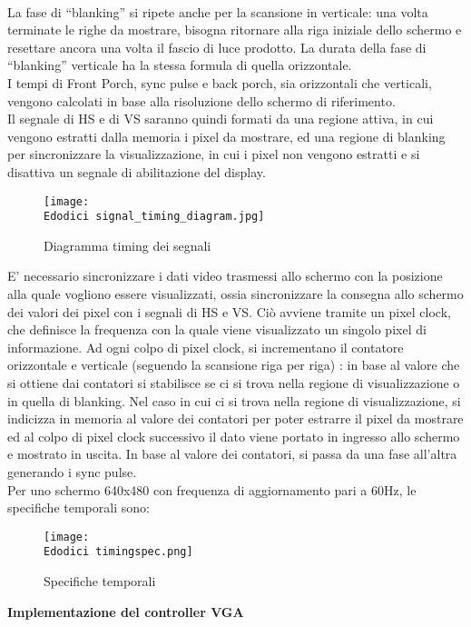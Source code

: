 \documentclass[12pt]{article}
\def \Edodici {Allegati/Esercizio12/}
\begin{document}
{\\La fase di “blanking” si ripete anche per la scansione in verticale: una volta terminate le righe da mostrare, bisogna ritornare alla riga iniziale dello schermo e resettare ancora una volta il fascio di luce prodotto. La durata della fase di “blanking” verticale ha la stessa formula di quella orizzontale.
\\I tempi di Front Porch, sync pulse e back porch, sia orizzontali che verticali, vengono calcolati in base alla risoluzione dello schermo di riferimento. 
\\Il segnale di HS e di VS saranno quindi formati da una regione attiva, in cui vengono estratti dalla memoria i pixel da mostrare, ed una regione di blanking per sincronizzare la visualizzazione, in cui i pixel non vengono estratti e si disattiva un segnale di abilitazione del display.  
\begin{figure}[ht!]
    \centering
    \texttt{[image: \\Edodici signal\_timing\_diagram.jpg]}
    \caption{Diagramma timing dei segnali}
\end{figure}
\newpage
E’ necessario sincronizzare i dati video trasmessi allo schermo con la posizione alla quale vogliono essere visualizzati, ossia sincronizzare la consegna allo schermo dei valori dei pixel con i segnali di HS e VS. Ciò avviene tramite un pixel clock, che definisce la frequenza con la quale viene visualizzato un singolo pixel di informazione. Ad ogni colpo di pixel clock, si incrementano il contatore orizzontale e verticale (seguendo la scansione riga per riga) : in base al valore che si ottiene dai contatori si stabilisce se ci si trova nella regione di visualizzazione o in quella di blanking. Nel caso in cui ci si trova nella regione di visualizzazione, si indicizza in memoria al valore dei contatori per poter estrarre il pixel da mostrare ed al colpo di pixel clock successivo il dato viene portato in ingresso allo schermo e mostrato in uscita. In base al valore dei contatori, si passa da una fase all’altra generando i sync pulse. 
\\Per uno schermo 640x480 con frequenza di aggiornamento pari a 60Hz, le specifiche temporali sono:
\begin{figure}[ht!]
    \centering
    \texttt{[image: \\Edodici timingspec.png]}
    \caption{Specifiche temporali}
\end{figure}
\clearpage
{\large \textbf{Implementazione del controller VGA}}
\begin{figure}[ht]

\end{figure}}
\end{document}
